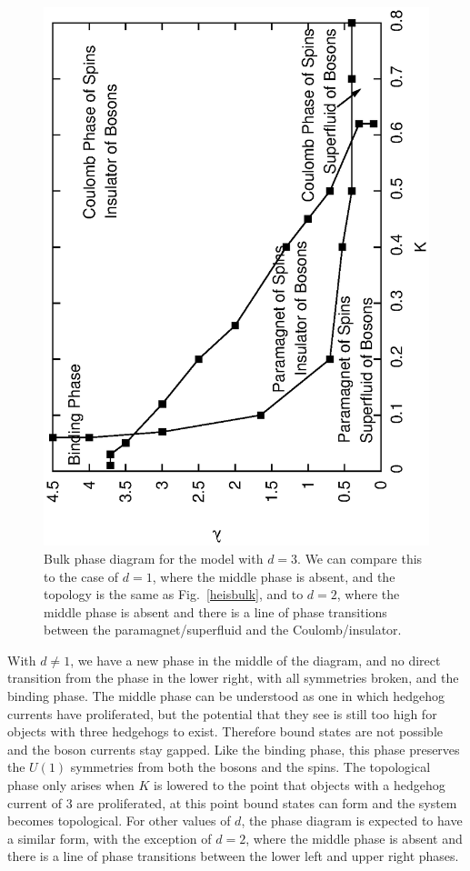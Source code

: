 \documentclass[prb,twocolumn]{revtex4-1}
\begin{document}
\begin{figure}
\includegraphics[angle=-90,width=0.9\linewidth]{figures/fracphase.eps}
\caption{Bulk phase diagram for the model with $d=3$. We can compare this to the case of $d=1$, where the middle phase is absent, and the topology is the same as Fig.~\ref{heisbulk}, and to $d=2$, where the middle phase is absent and there is a line of phase transitions between the paramagnet/superfluid and the Coulomb/insulator.}
\label{fracphase}
\end{figure}

 With $d\neq 1$, we have a new phase in the middle of the diagram, and no direct transition from the phase in the lower right, with all symmetries broken, and the binding phase. The middle phase can be understood as one in which hedgehog currents have proliferated, but the potential that they see is still too high for objects with three hedgehogs to exist. Therefore bound states are not possible and the boson currents stay gapped. Like the binding phase, this phase preserves the $U(1)$ symmetries from both the bosons and the spins. The topological phase only arises when $K$ is lowered to the point that objects with a hedgehog current of $3$ are proliferated, at this point bound states can form and the system becomes topological. For other values of $d$, the phase diagram is expected to have a similar form, with the exception of $d=2$, where the middle phase is absent and there is a line of phase transitions between the lower left and upper right phases. 
\end{document}
